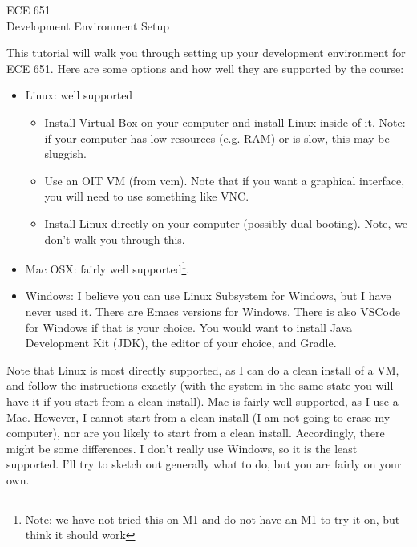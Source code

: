 \documentclass[12pt]{article}
\begin{document}
\begin{center}
  {\Large ECE 651\\ Development Environment Setup}
\end{center}


This tutorial will walk you through setting up your development
environment for ECE 651.  Here are some options and how well they
are supported by the course:

\begin{itemize}
\item Linux: well supported
  \begin{itemize}
  \item Install Virtual Box on your computer and install Linux inside of it.  Note:  if your computer has low resources (e.g. RAM) or is slow, this may be sluggish.
  \item Use an OIT VM (from vcm).  Note that if you want a graphical interface, you will need to use something like VNC. 
  \item Install Linux directly on your computer (possibly dual booting).  Note, we don't walk you through this. 
  \end{itemize}
\item Mac OSX: fairly well supported\footnote{Note: we have not tried this on M1 and do not have an M1 to try it on, but think it should work}.
\item Windows: I believe you can use Linux Subsystem for Windows, but I have never
  used it.  There are Emacs versions for Windows.  There is also
  VSCode for Windows if that is your choice.  You would want to install Java Development Kit (JDK),
  the editor of your choice, and Gradle. 
\end{itemize}

Note that Linux is most directly supported, as I can do a clean
install of a VM, and follow the instructions exactly (with the system
in the same state you will have it if you start from a clean install).
Mac is fairly well supported, as I use a Mac.  However, I cannot start from a clean install
(I am not going to erase my computer), nor are you likely to start from a clean install.  Accordingly,
there might be some differences.   I don't really use Windows, so it is the least supported.  I'll try
to sketch out generally what to do, but you are fairly on your own.
\end{document}

